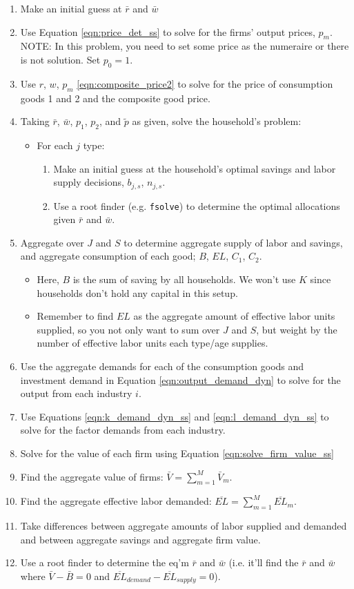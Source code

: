 \documentclass[letterpaper,12pt]{article}
\theoremstyle{definition}
\begin{document}
\begin{spacing}{1.5}
\begin{enumerate}
\item Make an initial guess at $\bar{r}$ and $\bar{w}$
\item Use Equation \ref{eqn:price_det_ss} to solve for the firms' output prices, $p_{m}$.  NOTE: In this problem, you need to set some price as the numeraire or there is not solution.  Set $p_{0} = 1$.
\item Use $r$,  $w$, $p_{m}$ \ref{eqn:composite_price2} to solve for the price of consumption goods 1 and 2 and the composite good price.
\item Taking $\bar{r}$, $\bar{w}$, $p_{1}$, $p_{2}$, and $\tilde{p}$ as given, solve the household's problem:
	\begin{itemize}
	\item For each $j$ type:
		\begin{enumerate}
		\item Make an initial guess at the household's optimal savings and labor supply decisions, $b_{j,s}$, $n_{j,s}$.
		\item Use a root finder (e.g. \texttt{fsolve}) to determine the optimal allocations given $\bar{r}$ and $\bar{w}$.
		\end{enumerate}
	\end{itemize}
\item Aggregate over $J$ and $S$ to determine aggregate supply of labor and savings, and aggregate consumption of each good; $B$, $EL$, $C_{1}$, $C_{2}$.
	\begin{itemize}
	\item Here, $B$ is the sum of saving by all households.  We won't use $K$ since households don't hold any capital in this setup.
	\item Remember to find $EL$ as the aggregate amount of effective labor units supplied, so you not only want to sum over $J$ and $S$, but weight by the number of effective labor units each type/age supplies.
	\end{itemize}
\item Use the aggregate demands for each of the consumption goods and investment demand in Equation \ref{eqn:output_demand_dyn} to solve for the output from each industry $i$.
\item Use Equations \ref{eqn:k_demand_dyn_ss} and \ref{eqn:l_demand_dyn_ss} to solve for the factor demands from each industry.
\item Solve for the value of each firm using Equation \ref{eqn:solve_firm_value_ss}
\item Find the aggregate value of firms: $\bar{V} = \sum_{m=1}^{M}\bar{V}_{m}$.
\item Find the aggregate effective labor demanded: $\overline{EL} =\sum_{m=1}^{M} \overline{EL}_{m}$.
\item Take differences between aggregate amounts of labor supplied and demanded and between aggregate savings and aggregate firm value.
\item Use a root finder to determine the eq'm $\bar{r}$ and $\bar{w}$ (i.e. it'll find the $\bar{r}$ and $\bar{w}$ where $\bar{V}-\bar{B}=0$ and $\overline{EL}_{demand}-\overline{EL}_{supply}=0$).
\end{enumerate}



\end{spacing}
\end{document}
